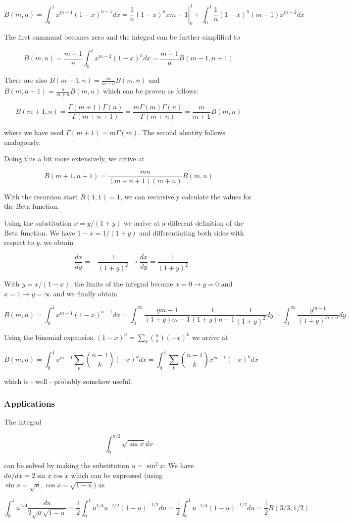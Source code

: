 \[
B(m,n) = \int_0^1 x^{m-1} (1-x)^{n-1} dx = \left. \frac{1}{n} (1-x)^n x{m-1} \right|_0^1 + \int_0^1 \frac{1}{n} (1-x)^n (m-1) x^{m-2} dx
\]

The first summand becomes zero and the integral can be further
simplified to

\[
B(m,n) = \frac{m-1}{n} \int_0^1 x^{m-2} (1-x)^n dx = \frac{m-1}{n} B(m-1, n+1)
\]

There are also \(B(m+1,n)= \frac{m}{m+n}B(m,n)\) and
\(B(m,n+1)=\frac{n}{m+n}B(m,n)\) which can be proven as follows:

\[
B(m+1,n) = \frac{\Gamma(m+1)\Gamma(n)}{\Gamma(m+n+1)} = \frac{m \Gamma(m)\Gamma(n)}{\Gamma(m+n)} = \frac{m}{m+1}B(m,n)
\]

where we have used \(\Gamma(m+1) = m \Gamma(m)\). The second identity
follows analogously.

Doing this a bit more extensively, we arrive at

\[
B(m+1,n+1) = \frac{mn}{(m+n+1)(m+n)}B(m,n)
\]

With the recursion start \(B(1,1) = 1\), we can recursively calculate
the values for the Beta function.

Using the substitution \(x = y/(1+y)\) we arrive at a different
definition of the Beta function. We have \(1 - x = 1/(1+y)\) and
differentiating both sides with respect to \(y\), we obtain

\[
-\frac{dx}{dy} = -\frac{1}{(1+y)^2} \rightarrow \frac{dx}{dy} = \frac{1}{(1+y)^2}
\]

With \(y = x/(1-x)\), the limits of the integral become
\(x=0 \rightarrow y=0\) and \(x=1 \rightarrow y=\infty\) and we finally
obtain

\[
B(m,n) = \int_0^1 x^{m-1} (1-x)^{n-1} dx = \int_0^\infty \frac{y{m-1}}{(1+y){m-1}} \frac{1}{(1+y){n-1}} \frac{1}{(1+y)^2} dy = \int_0^\infty \frac{y^{m-1}}{(1+y)^{m+n}} dy
\]

Using the binomial expansion \((1-x)^n = \sum_k {n \choose k} (-x)^k\)
we arrive at

\[
B(m,n) = \int_0^1 x^{m-1} \sum_k {n-1 \choose k} (-x)^k dx = \int_0^1 \sum_k {n-1 \choose k} x^{m-1} (-x)^k dx
\]

which is - well - probably somehow useful.

\subsubsection{Applications}

The integral

\[
\int_0^{\pi/2} \sqrt{\sin x} dx
\]

can be solved by making the substitution \(u=\sin^2 x\): We have
\(du/dx = 2 \sin x \cos x\) which can be expressed (using
\(\sin x= \sqrt{u}, \cos x = \sqrt{1-u}\)) as

\[
\int_0^1 u^{1/4} \frac{du}{2\sqrt{u}\sqrt{1-u}} = \frac{1}{2} \int_0^1 u^{1/4} u^{-1/2} (1-u)^{-1/2} du = \frac{1}{2} \int_0^1 u^{-1/4} (1-u)^{-1/2} du = \frac{1}{2} B(3/3,1/2)
\]

